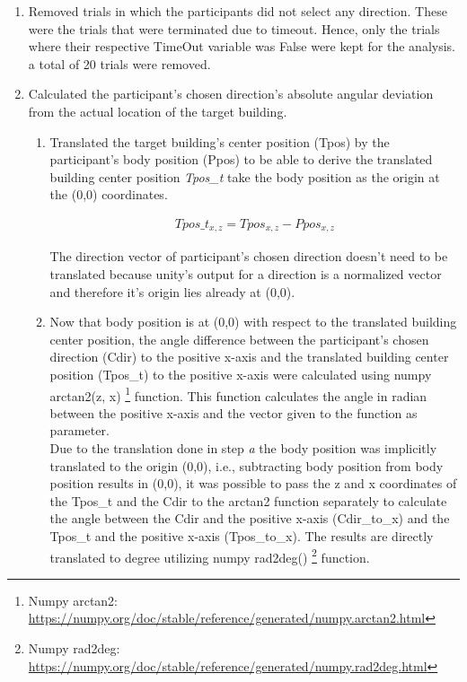 \begin{enumerate}
	\item Removed trials in which the participants did not select any direction. These were the trials that were terminated due to timeout. Hence, only the trials where their respective TimeOut variable was False were kept for the analysis. a total of 20 trials were removed. \\
	
	\item Calculated the participant's chosen direction's absolute angular deviation from the actual location of the target building.
	
	\begin{enumerate}
		\item Translated the target building's center position {\emphasize(Tpos)} by the participant's body position {\emphasize(Ppos)} to be able to derive the translated building center position {\emph{Tpos\_t}} take the body position as the origin at the (0,0) coordinates.
		
			\begin{align*}
				Tpos\_t_{x,z}= Tpos_{x,z} - Ppos_{x,z}
			\end{align*}
		
		The direction vector of participant's chosen direction doesn't need to be translated because unity's output for a direction is a normalized vector and therefore it's origin lies already at (0,0).\\
		
		\item Now that body position is at (0,0) with respect to the translated building center position, the angle difference between the participant's chosen direction {\emphasize(Cdir)} to the positive x-axis and the translated building center position {\emphasize(Tpos\_t)} to the positive x-axis were calculated using numpy arctan2(z, x) \footnote{Numpy arctan2: \href{https://numpy.org/doc/stable/reference/generated/numpy.arctan2.html}{https://numpy.org/doc/stable/reference/generated/numpy.arctan2.html}} function. This function calculates the angle in radian between the positive x-axis and the vector given to the function as parameter. \\
		Due to the translation done in step \emph{a} the body position was implicitly translated to the origin (0,0), i.e., subtracting body position from body position results in (0,0), it was possible to pass the z and x coordinates of the {\emphasize Tpos\_t} and the {\emphasize Cdir} to the arctan2 function separately to calculate the angle between the {\emphasize Cdir} and the positive x-axis {\emphasize (Cdir\_to\_x)} and the {\emphasize Tpos\_t} and the positive x-axis {\emphasize (Tpos\_to\_x)}. The results are directly translated to degree utilizing numpy rad2deg() \footnote{Numpy rad2deg: \href{https://numpy.org/doc/stable/reference/generated/numpy.rad2deg.html}{https://numpy.org/doc/stable/reference/generated/numpy.rad2deg.html}} function.
	

\end{enumerate}
\end{enumerate}

